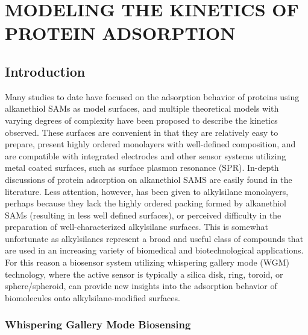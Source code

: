 
\chapter{MODELING THE KINETICS OF PROTEIN ADSORPTION}


\section{Introduction}

Many studies to date have focused on the adsorption behavior of proteins
using alkanethiol SAMs as model surfaces, and multiple theoretical
models with varying degrees of complexity have been proposed to describe
the kinetics observed. These surfaces are convenient in that they
are relatively easy to prepare, present highly ordered monolayers
with well-defined composition, and are compatible with integrated
electrodes and other sensor systems utilizing metal coated surfaces,
such as surface plasmon resonance (SPR). In-depth discussions of protein
adsorption on alkanethiol SAMS are easily found in the literature.
Less attention, however, has been given to alkylsilane monolayers,
perhaps because they lack the highly ordered packing formed by alkanethiol
SAMs (resulting in less well defined surfaces), or perceived difficulty
in the preparation of well-characterized alkylsilane surfaces. This
is somewhat unfortunate as alkylsilanes represent a broad and useful
class of compounds that are used in an increasing variety of biomedical
and biotechnological applications. For this reason a biosensor system
utilizing whispering gallery mode (WGM) technology, where the active
sensor is typically a silica disk, ring, toroid, or sphere/spheroid,
can provide new insights into the adsorption behavior of biomolecules
onto alkylsilane-modified surfaces. 


\subsection{Whispering Gallery Mode Biosensing}

